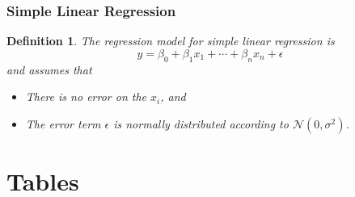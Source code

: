 \documentclass[1pt]{report}
\newtheorem{defn}[thm]{Definition}
\newcommand{\<}{\langle}
\renewcommand{\>}{\rangle}
\newcommand{\NN}{\mathcal{N}}
\begin{document}
\section{Simple Linear Regression}
\begin{defn}
The \emph{regression model} for simple linear regression is 
$$y = \beta_0 + \beta_1 x_1 + \cdots + \beta_n x_n + \epsilon$$
and assumes that
\begin{itemize}
\item There is no error on the $x_i$, and
\item The error term $\epsilon$ is normally distributed according to $\NN(0, \sigma^2)$.
\end{itemize}
\end{defn}
\part{Tables}
\end{document}
